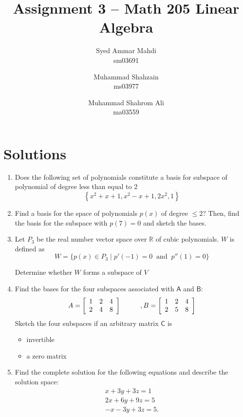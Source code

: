 \documentclass[a4paper, 11pt]{article}
\title{Assignment 3 -- Math 205 Linear Algebra}
\author{Syed Ammar Mahdi \\sm03691 \and Muhammad Shahzain \\ms03977 \and Muhammad Shahrom Ali \\ma03559}
\newcommand{\mat}[1]{\boldsymbol { \mathsf{#1}} }
\begin{document}
\setlength{\parskip}{10pt} %
\setlength{\parindent}{0pt}
\maketitle

\section*{Solutions}
\begin{enumerate} 

\item Does the following set of polynomials constitute a basis for subspace of polynomial of degree less than equal to 2 \[
\left\{x^2 + x + 1, x^2 - x + 1, 2x^2, 1 \right\}
\]

\item Find a basis for the space of polynomials $p(x)$ of degree $\leq 2$? Then, find the basis for the subspace with $p(7) = 0$ and sketch the bases.

\item Let $P_3$ be the real number vector space over $\mathbb R$ of cubic polynomials. $W$ is defined as \[
W = \{p(x) \in P_3 \;|\; p'(-1) = 0 \;\; \text{and} \;\; p''(1) = 0\}
\]

Determine whether $W$ forms a subspace of $V$

\item Find the bases for the four subspaces associated with $\mat A$ and $\mat B$:
\[ A = \left[ \begin{array}{ccc}
1&2&4\\
2&4&8
\end{array} \right]
\hspace{10mm}, B = \left[ \begin{array}{ccc}
1&2&4\\
2&5&8
\end{array} \right]\]
Sketch the four subspaces if an arbitrary matrix $\mat C$ is \begin{itemize}
  \item invertible
  \item a zero matrix
\end{itemize}

\item Find the complete solution for the following equations and describe the solution space:
\begin{equation} \label{eq1}
\begin{split}
x + 3y + 3z = 1\\
2x + 6y + 9z = 5\\
-x - 3y +3z =5.
\end{split}
\end{equation}


\end{enumerate}
\end{document}
